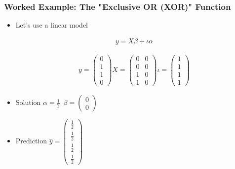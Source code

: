 \documentclass[
  shownotes,
  xcolor={svgnames},
  hyperref={colorlinks,citecolor=DarkBlue,linkcolor=DarkRed,urlcolor=DarkBlue}
  , aspectratio=169]{beamer}
\begin{document}
\begin{frame}
\frametitle{Worked Example: The "Exclusive OR (XOR)" Function}

\begin{itemize}
\item Let's use a linear model 

\begin{align}
y = X\beta + \iota \alpha 
\end{align}


 \begin{align}
 y=\left(\begin{array}{c}
0\\
1\\
1\\
0
\end{array}\right)X=\left(\begin{array}{cc}
0 & 0\\
0 & 0\\
1 & 0\\
1 & 0
\end{array}\right)\iota=\left(\begin{array}{c}
1\\
1\\
1\\
1
\end{array}\right)
 \end{align}

\item Solution $ \alpha=\frac{1}{2} \,\,\,\beta=\left(\begin{array}{c}
0\\
0
\end{array}\right)
$


\item Prediction $\hat{y}=\left(\begin{array}{c}
\frac{1}{2}\\
\frac{1}{2}\\
\frac{1}{2}\\
\frac{1}{2}
\end{array}\right)$
\end{itemize}


\end{frame}
\end{document}
